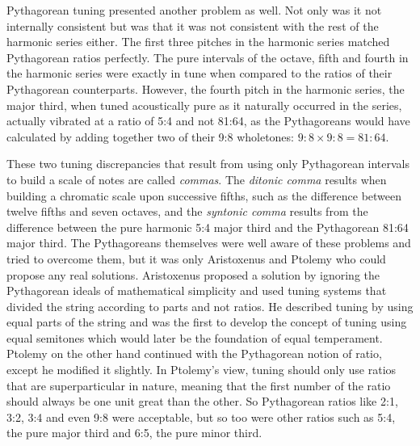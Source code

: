 Pythagorean tuning presented another problem as well.  Not only was it not internally
consistent but was that it was not consistent with the rest of the harmonic series either.
The first three pitches in the harmonic series matched Pythagorean ratios perfectly.  The
pure intervals of the octave, fifth and fourth in the harmonic series were exactly in tune
when compared to the ratios of their Pythagorean counterparts. However, the fourth pitch
in the harmonic series, the major third, when tuned acoustically pure as it naturally
occurred in the series, actually vibrated at a ratio of 5:4 and not 81:64, as the
Pythagoreans would have calculated by adding together two of their 9:8 wholetones: $ 9:8
\times 9:8 = 81:64 $.

These two tuning discrepancies that result from using only Pythagorean intervals to build
a scale of notes are called \textit{commas}.  The \textit{ditonic comma} results when
building a chromatic scale upon successive fifths, such as the difference between twelve
fifths and seven octaves, and the \textit{syntonic comma} results from the difference
between the pure harmonic 5:4 major third and the Pythagorean 81:64 major third.  The
Pythagoreans themselves were well aware of these problems and tried to overcome them, but
it was only Aristoxenus and Ptolemy who could propose any real solutions. Aristoxenus
proposed a solution by ignoring the Pythagorean ideals of mathematical simplicity and used
tuning systems that divided the string according to parts and not ratios.  He described
tuning by using equal parts of the string and was the first to develop the concept of
tuning using equal semitones which would later be the foundation of equal temperament.
Ptolemy on the other hand continued with the Pythagorean notion of ratio, except he
modified it slightly.  In Ptolemy's view, tuning should only use ratios that are
superparticular in nature, meaning that the first number of the ratio should always be one
unit great than the other.  So Pythagorean ratios like 2:1, 3:2, 3:4 and even 9:8 were
acceptable, but so too were other ratios such as 5:4, the pure major third and 6:5, the
pure minor third.

